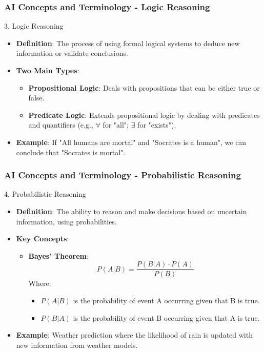 \documentclass[aspectratio=169]{beamer}
\begin{document}
\begin{frame}[fragile]
    \frametitle{AI Concepts and Terminology - Logic Reasoning}
    \begin{block}{3. Logic Reasoning}
        \begin{itemize}
            \item \textbf{Definition}: The process of using formal logical systems to deduce new information or validate conclusions.
            \item \textbf{Two Main Types}:
            \begin{itemize}
                \item \textbf{Propositional Logic}: Deals with propositions that can be either true or false.
                \item \textbf{Predicate Logic}: Extends propositional logic by dealing with predicates and quantifiers (e.g., $\forall$ for "all"; $\exists$ for "exists").
            \end{itemize}
            \item \textbf{Example}: If "All humans are mortal" and "Socrates is a human", we can conclude that "Socrates is mortal".
        \end{itemize}
    \end{block}
\end{frame}

\begin{frame}[fragile]
    \frametitle{AI Concepts and Terminology - Probabilistic Reasoning}
    \begin{block}{4. Probabilistic Reasoning}
        \begin{itemize}
            \item \textbf{Definition}: The ability to reason and make decisions based on uncertain information, using probabilities.
            \item \textbf{Key Concepts}:
            \begin{itemize}
                \item \textbf{Bayes' Theorem}:
                \begin{equation}
                    P(A|B) = \frac{P(B|A) \cdot P(A)}{P(B)}
                \end{equation}
                Where:
                \begin{itemize}
                    \item $P(A|B)$ is the probability of event A occurring given that B is true.
                    \item $P(B|A)$ is the probability of event B occurring given that A is true.
                \end{itemize}
            \end{itemize}
            \item \textbf{Example}: Weather prediction where the likelihood of rain is updated with new information from weather models.
        \end{itemize}
    \end{block}
\end{frame}
\end{document}
